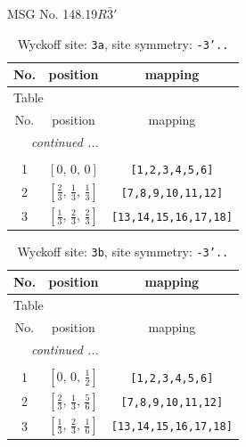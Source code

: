 \documentclass[fleqn,8pt]{jsarticle}
\begin{document}
\setcounter{MaxMatrixCols}{32}

\renewcommand{\tablename}{Table~}
\renewcommand{\figurename}{Figure~}
\begin{center}
\LARGE
MSG No. 148.19\quad$R\bar{3}'$
\end{center}
\renewcommand{\arraystretch}{1.2}
\begin{longtable}{ccc}
\caption{Wyckoff site: {\tt 3a}, site symmetry: {\tt -3'..}}
 \\
 \hline \hline
No. & position & mapping \\ \hline \endfirsthead

\multicolumn{2}{l}{\tablename\ \thetable{}} \\
 \hline \hline
No. & position & mapping \\ \hline \endhead

 \hline \hline
\multicolumn{2}{r}{\footnotesize\it continued ...} \\ \endfoot

 \hline \hline
\multicolumn{2}{r}{} \\ \endlastfoot

1 & $\left[ 0,\, 0,\, 0 \right]$ & {\tt [1,2,3,4,5,6]} \\ \hline
2 & $\left[ \frac{2}{3},\, \frac{1}{3},\, \frac{1}{3} \right]$ & {\tt [7,8,9,10,11,12]} \\ \hline
3 & $\left[ \frac{1}{3},\, \frac{2}{3},\, \frac{2}{3} \right]$ & {\tt [13,14,15,16,17,18]} \\
\end{longtable}
\renewcommand{\arraystretch}{1.2}
\begin{longtable}{ccc}
\caption{Wyckoff site: {\tt 3b}, site symmetry: {\tt -3'..}}
 \\
 \hline \hline
No. & position & mapping \\ \hline \endfirsthead

\multicolumn{2}{l}{\tablename\ \thetable{}} \\
 \hline \hline
No. & position & mapping \\ \hline \endhead

 \hline \hline
\multicolumn{2}{r}{\footnotesize\it continued ...} \\ \endfoot

 \hline \hline
\multicolumn{2}{r}{} \\ \endlastfoot

1 & $\left[ 0,\, 0,\, \frac{1}{2} \right]$ & {\tt [1,2,3,4,5,6]} \\ \hline
2 & $\left[ \frac{2}{3},\, \frac{1}{3},\, \frac{5}{6} \right]$ & {\tt [7,8,9,10,11,12]} \\ \hline
3 & $\left[ \frac{1}{3},\, \frac{2}{3},\, \frac{1}{6} \right]$ & {\tt [13,14,15,16,17,18]} \\
\end{longtable}
\end{document}
